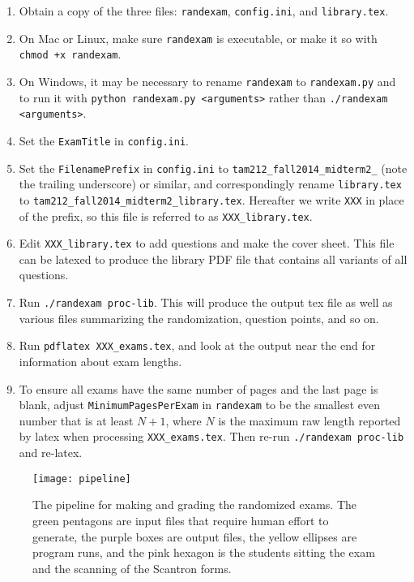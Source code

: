 \documentclass{article}
\begin{document}
\begin{enumerate}
\item Obtain a copy of the three files: \texttt{randexam},
  \texttt{config.ini}, and \texttt{library.tex}.
\item On Mac or Linux, make sure \texttt{randexam} is executable, or
  make it so with \texttt{chmod +x randexam}.
\item On Windows, it may be necessary to rename \texttt{randexam} to
  \texttt{randexam.py} and to run it with \texttt{python randexam.py
    <arguments>} rather than \texttt{./randexam <arguments>}.
\item Set the \texttt{ExamTitle} in \texttt{config.ini}.
\item Set the \texttt{FilenamePrefix} in \texttt{config.ini} to
  \texttt{tam212_fall2014_midterm2_} (note the trailing underscore) or
  similar, and correspondingly rename \texttt{library.tex} to
  \texttt{tam212_fall2014_midterm2_library.tex}. Hereafter we write
  \texttt{XXX} in place of the prefix, so this file is referred to as
  \texttt{XXX_library.tex}.
\item Edit \texttt{XXX_library.tex} to add questions and make the
  cover sheet. This file can be latexed to produce the library PDF
  file that contains all variants of all questions.
\item Run \texttt{./randexam proc-lib}. This will produce the output
  tex file as well as various files summarizing the randomization,
  question points, and so on.
\item Run \texttt{pdflatex XXX_exams.tex}, and look at the output near
  the end for information about exam lengths.
\item To ensure all exams have the same number of pages and the last
  page is blank, adjust \texttt{MinimumPagesPerExam} in
  \texttt{randexam} to be the smallest even number that is at least $N
  + 1$, where $N$ is the maximum raw length reported by latex when
  processing \texttt{XXX_exams.tex}. Then re-run \texttt{./randexam
    proc-lib} and re-latex.
\end{enumerate}

\begin{figure}
  \centering
  \texttt{[image: pipeline]}
  \caption{The pipeline for making and grading the randomized
    exams. The green pentagons are input files that require human
    effort to generate, the purple boxes are output files, the yellow
    ellipses are program runs, and the pink hexagon is the students
    sitting the exam and the scanning of the Scantron forms.}
  \label{fig:pipeline}
\end{figure}
\end{document}
